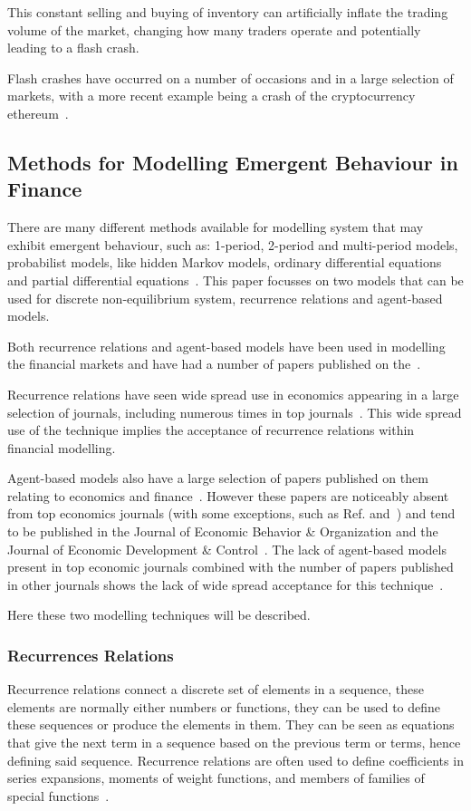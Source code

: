 \documentclass{article}
\begin{document}
This constant selling and buying of inventory can artificially inflate the trading volume of the market, changing how many traders operate and potentially leading to a flash crash.

Flash crashes have occurred on a number of occasions and in a large selection of markets, with a more recent example being a crash of the cryptocurrency ethereum~\cite{cryptocrash}.


\subsection{Methods for Modelling Emergent Behaviour in Finance}  \label{litreviewofabmrr} 
There are many different methods available for modelling system that may exhibit emergent behaviour, such as: 1-period, 2-period and multi-period models, probabilist models, like hidden Markov models, ordinary differential equations and partial differential equations~\cite{modles1, modles2, moldes3, moldes4}. This paper focusses on two models that can be used for discrete non-equilibrium system, recurrence relations and agent-based models. 

Both recurrence relations and agent-based models have been used in modelling the financial markets and have had a number of papers published on the~\cite{rra10, rra1, abma2}.

Recurrence relations have seen wide spread use in economics appearing in a large selection of journals, including numerous times in top journals~\cite{rra2, rra3, rra4, rra5, rra6, rra7, rra8, rra9}. This wide spread use of the technique implies the acceptance of recurrence relations within financial modelling.      

Agent-based models also have a large selection of papers published on them relating to economics and finance~\cite{abma3, abma4}. However these papers are noticeably absent from top economics journals (with some exceptions, such as Ref.\cite{abmexp1} and~\cite{abmexp2}) and tend to be published in the Journal of Economic Behavior \& Organization and the Journal of Economic Development \& Control~\cite{whereabmp, farmerfoleynature}. The lack of agent-based models present in top economic journals combined with the number of papers published in other journals shows the lack of wide spread acceptance for this technique~\cite{agbntj, econmistsnoabm, lob_noecomimists}.

Here these two modelling techniques will be described.  


\subsubsection{Recurrences Relations} 
Recurrence relations connect a discrete set of elements in a sequence, these elements are normally either numbers or functions, they can be used to define these sequences or produce the elements in them. They can be seen as equations that give the next term in a sequence based on the previous term or terms, hence defining said sequence. Recurrence relations are often used to define coefficients in series expansions, moments of weight functions, and members of families of special functions~\cite{recurrelationbook}.
\end{document}
